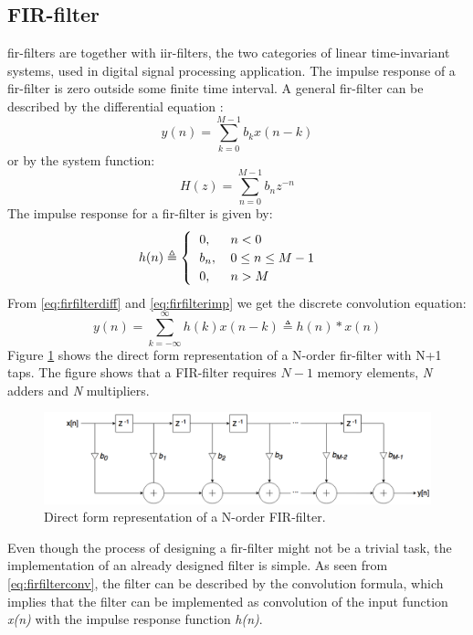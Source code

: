 \subsection{\label{subsec:refdesfir}FIR-filter}
\gls{fir}-filters are together with \gls{iir}-filters, the two categories of linear time-invariant systems, used in digital signal processing application. The impulse response of a \gls{fir}-filter is zero outside some finite time interval. 
A general \gls{fir}-filter can be described by the differential equation \cite{proakis2007digital}:
\begin{equation}
    y(n)=\sum\limits_{k=0}^{M-1} b_kx(n-k)
    \label{eq:firfilterdiff}
\end{equation}
or by the system function:
\begin{equation}
    H(z)=\sum\limits_{n=0}^{M-1} b_nz^{-n}
    \label{eq:firfiltersys}
\end{equation}
The impulse response for a \gls{fir}-filter is given by:
\begin{equation}
    h(n)\triangleq
    \begin{cases}
    \begin{tabular}{ll}
      $0,$ & $n < 0$  \\
      $b_n,$ & $0 \leq n \leq M-1$  \\
      $0,$ & $n > M$   
      \end{tabular}
    \end{cases}
    \label{eq:firfilterimp}
\end{equation}
From \cref{eq:firfilterdiff} and \cref{eq:firfilterimp} we get the discrete convolution equation:
\begin{equation}
    y(n)=\sum\limits_{k=-\infty}^{\infty} h(k)x(n-k) \triangleq h(n) \ast x(n)
    \label{eq:firfilterconv}
\end{equation}
\noindent
Figure \ref{fig:firfilter} shows the direct form representation of a N-order \gls{fir}-filter with N+1 taps. The figure shows that a FIR-filter requires $N-1$ memory elements, \textit{N} adders and \textit{N} multipliers. 
\begin{figure}[hbpt]
\centering
\includegraphics[width=\textwidth]{../figs/FIRFilter.png}
\caption{\label{fig:firfilter}Direct form representation of a N-order FIR-filter.}
\end{figure}


Even though the process of designing a \gls{fir}-filter might not be a trivial task, the implementation of an already designed filter is simple. As seen from \cref{eq:firfilterconv}, the filter can be described by the convolution formula, which implies that the filter can be implemented as convolution of the input function \textit{x(n)} with the impulse response function \textit{h(n)}.